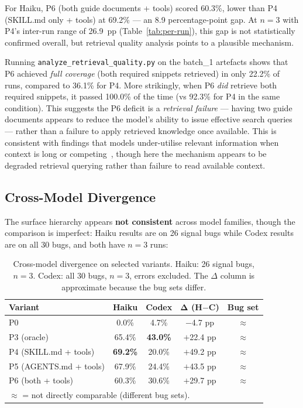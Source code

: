 \documentclass[10pt,a4paper,twocolumn]{article}
\begin{document}
For Haiku, P6 (both guide documents + tools) scored 60.3\%, lower than
P4 (SKILL.md only + tools) at 69.2\% --- an 8.9 percentage-point gap.
At $n{=}3$ with P4's inter-run range of 26.9~pp
(Table~\ref{tab:per-run}), this gap is not statistically confirmed
overall, but retrieval quality analysis points to a plausible mechanism.

Running \texttt{analyze\_retrieval\_quality.py} on the batch\_1
artefacts shows that P6 achieved \emph{full coverage} (both required
snippets retrieved) in only 22.2\% of runs, compared to 36.1\% for P4.
More strikingly, when P6 \emph{did} retrieve both required snippets, it
passed 100.0\% of the time (vs 92.3\% for P4 in the same condition).
This suggests the P6 deficit is a \emph{retrieval failure} --- having
two guide documents appears to reduce the model's ability to issue
effective search queries --- rather than a failure to apply retrieved
knowledge once available.
This is consistent with findings that models under-utilise relevant
information when context is long or
competing~\citep{liu2023lostmiddle}, though here the mechanism appears
to be degraded retrieval querying rather than failure to read available
context.

\subsection{Cross-Model Divergence}
\label{sec:cross-model}

The surface hierarchy appears \textbf{not consistent} across model
families, though the comparison is imperfect: Haiku results are on
26 signal bugs while Codex results are on all 30 bugs, and both have
$n{=}3$ runs:

\begin{table}[H]
\centering
\caption{Cross-model divergence on selected variants. Haiku: 26 signal
bugs, $n{=}3$. Codex: all 30 bugs, $n{=}3$, errors excluded.
The $\Delta$ column is approximate because the bug sets differ.}
\label{tab:cross-model}
\begin{tabular}{@{}lcccc@{}}
\toprule
\textbf{Variant} & \textbf{Haiku} & \textbf{Codex} &
$\boldsymbol{\Delta}$ \textbf{(H$-$C)} & \textbf{Bug set} \\
\midrule
P0                     & 0.0\%           & 4.7\%           & $-$4.7 pp  & $\approx$ \\
P3 (oracle)            & 65.4\%          & \textbf{43.0\%} & $+$22.4 pp & $\approx$ \\
P4 (SKILL.md + tools)  & \textbf{69.2\%} & 20.0\%          & $+$49.2 pp & $\approx$ \\
P5 (AGENTS.md + tools) & 67.9\%          & 24.4\%          & $+$43.5 pp & $\approx$ \\
P6 (both + tools)      & 60.3\%          & 30.6\%          & $+$29.7 pp & $\approx$ \\
\bottomrule
\multicolumn{5}{l}{\small $\approx$ = not directly comparable
(different bug sets).} \\
\end{tabular}
\end{table}
\end{document}
